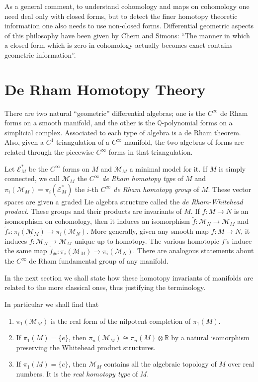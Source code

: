 \documentclass[11pt]{amsart}
\theoremstyle{plain}
\theoremstyle{definition}
\newcommand{\sE}{\mathscr{E}}
\newcommand{\cM}{\mathcal{M}}
\newcommand{\RR}{\mathbb{R}}
\newcommand{\QQ}{\mathbb{Q}}
\begin{document}
As a general comment, to understand cohomology and maps on cohomology one need deal only with closed forms, but to detect the finer homotopy theoretic information one also needs to use non-closed forms. Differential geometric aspects of this philosophy have been given by Chern and Simons: ``The manner in which a closed form which is zero in cohomology actually becomes exact contains geometric information''.


\section{De Rham Homotopy Theory}

There are two natural ``geometric'' differential algebras; one is the $C^{\infty}$ de Rham forms on a smooth manifold, and the other is the $\QQ$-polynomial forms on a simplicial complex. Associated to each type of algebra is a de Rham theorem. Also, given a $C^{1}$ triangulation of a $C^{\infty}$ manifold, the two algebras of forms are related through the piecewise $C^{\infty}$ forms in that triangulation.

Let $\sE^{*}_{M}$ be the $C^{\infty}$ forms on $M$ and $\cM_{M}$ a minimal model for it. If $M$ is simply connected, we call $\cM_{M}$ the \emph{$C^{\infty}$ de Rham homotopy type} of $M$ and $\pi_{i}(\cM_{M}) = \pi_{i}(\sE^{*}_{M})$ the $i$-th \emph{$C^{\infty}$ de Rham homotopy group} of $M$. These vector spaces are given a graded Lie algebra structure called the \emph{de Rham-Whitehead product}. These groups and their products are invariants of $M$. If $f \colon M \to N$ is an isomorphism on cohomology, then it induces an isomorphism $\tilde{f} \colon \cM_{N} \to \cM_{M}$ and $\tilde{f}_{*} \colon \pi_{i}(\cM_{M}) \to \pi_{i}(\cM_{N})$. More generally, given any smooth map $f \colon M \to N$, it induces $\tilde{f} \colon \cM_{N} \to \cM_{M}$ unique up to homotopy. The various homotopic $\tilde{f}$'s induce the same map $\tilde{f}_{\#} \colon \pi_{i}(\cM_{M}) \to \pi_{i}(\cM_{N})$. There are analogous statements about the $C^{\infty}$ de Rham fundamental group of any manifold.

In the next section we shall state how these homotopy invariants of manifolds are related to the more classical ones, thus justifying the terminology.

In particular we shall find that
\begin{enumerate}
\item $\pi_{1}(\cM_{M})$ is the real form of the nilpotent completion of $\pi_{1}(M)$.
\item If $\pi_{1}(M) = \{e\}$, then $\pi_{n}(\cM_{M}) \cong \pi_{n}(M) \otimes \RR$ by a natural isomorphism preserving the Whitehead product structures.
\item If $\pi_{1}(M) = \{e\}$, then $\cM_{M}$ contains all the algebraic topology of $M$ over real numbers. It is the \emph{real homotopy type} of $M$.
\end{enumerate}
\end{document}
